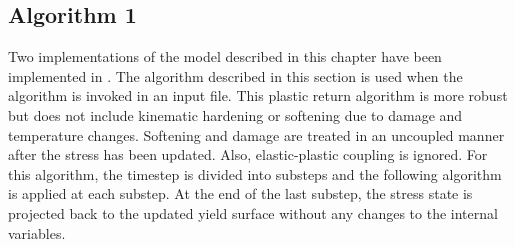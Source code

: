 \subsection{Algorithm 1}
Two implementations of the model described in this chapter have been implemented in
\Vaango.  The algorithm described in this section is used when the 
algorithm is invoked in an input file.  This plastic return algorithm is more robust but does not
include kinematic hardening or softening due to damage and temperature changes.  Softening and
damage are treated in an uncoupled manner after the stress has been updated. Also,
elastic-plastic coupling is ignored.  For this algorithm, the timestep is divided into substeps and
the following algorithm is applied at each substep.  At the end of the last substep, the stress
state is projected back to the updated yield surface without any changes to the internal variables.
